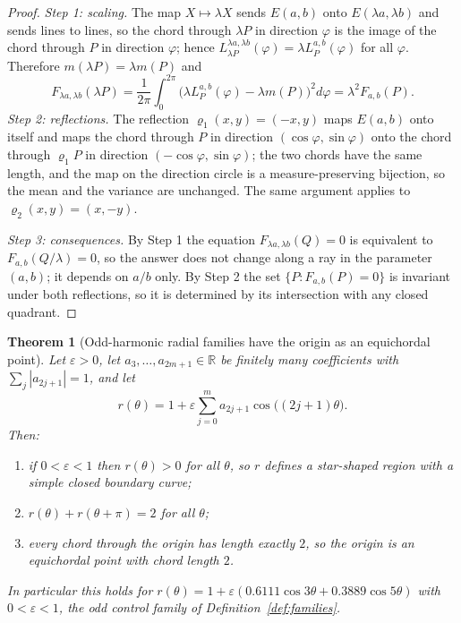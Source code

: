 \documentclass[11pt]{article}
\newcommand{\R}{\mathbb{R}}
\newtheorem{theorem}{Theorem}[section]
\theoremstyle{definition}
\theoremstyle{remark}
\begin{document}
\begin{proof}
\emph{Step 1: scaling.} The map $X\mapsto\lambda X$ sends $E(a,b)$ onto $E(\lambda a,\lambda b)$ and sends lines to
lines, so the chord through $\lambda P$ in direction $\varphi$ is the image of the chord through $P$ in direction
$\varphi$; hence $L^{\lambda a,\lambda b}_{\lambda P}(\varphi)=\lambda L^{a,b}_P(\varphi)$ for all $\varphi$.
Therefore $m(\lambda P)=\lambda m(P)$ and
\[
F_{\lambda a,\lambda b}(\lambda P)=\frac{1}{2\pi}\int_0^{2\pi}\bigl(\lambda L^{a,b}_P(\varphi)-\lambda m(P)\bigr)^2d\varphi
=\lambda^2F_{a,b}(P).
\]
\emph{Step 2: reflections.} The reflection $\varrho_1(x,y)=(-x,y)$ maps $E(a,b)$ onto itself and maps the chord
through $P$ in direction $(\cos\varphi,\sin\varphi)$ onto the chord through $\varrho_1P$ in direction
$(-\cos\varphi,\sin\varphi)$; the two chords have the same length, and the map on the direction circle is a
measure-preserving bijection, so the mean and the variance are unchanged. The same argument applies to
$\varrho_2(x,y)=(x,-y)$.

\emph{Step 3: consequences.} By Step 1 the equation $F_{\lambda a,\lambda b}(Q)=0$ is equivalent to
$F_{a,b}(Q/\lambda)=0$, so the answer does not change along a ray in the parameter $(a,b)$; it depends on $a/b$
only. By Step 2 the set $\{P:F_{a,b}(P)=0\}$ is invariant under both reflections, so it is determined by its
intersection with any closed quadrant.
\end{proof}

\begin{theorem}[Odd-harmonic radial families have the origin as an equichordal point]\label{thm:odd-harmonic}
Let $\varepsilon>0$, let $a_3,\dots,a_{2m+1}\in\R$ be finitely many coefficients with
$\sum_{j}|a_{2j+1}|=1$, and let
\[
r(\theta)=1+\varepsilon\sum_{j=0}^{m}a_{2j+1}\cos\bigl((2j+1)\theta\bigr).
\]
Then:
\begin{enumerate}
\item[(i)] if $0<\varepsilon<1$ then $r(\theta)>0$ for all $\theta$, so $r$ defines a star-shaped region with a
simple closed boundary curve;
\item[(ii)] $r(\theta)+r(\theta+\pi)=2$ for all $\theta$;
\item[(iii)] every chord through the origin has length exactly $2$, so the origin is an equichordal point with
chord length $2$.
\end{enumerate}
In particular this holds for $r(\theta)=1+\varepsilon(0.6111\cos3\theta+0.3889\cos5\theta)$ with $0<\varepsilon<1$, the
odd control family of Definition~\ref{def:families}.
\end{theorem}
\end{document}
